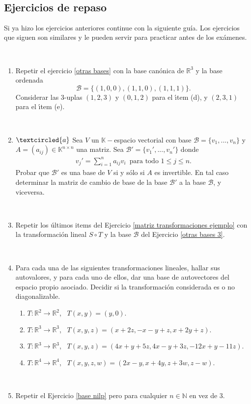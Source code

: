 \documentclass[12pt]{amsart}
\begin{document}
\


\subsection*{Ejercicios de repaso}
Si ya hizo los ejercicios anteriores continue con la siguiente gu\'ia. Los ejercicios que siguen son similares y le pueden servir para practicar antes de los ex\'amenes.

\

\begin{enumerate}[resume, topsep=5pt,itemsep=5pt]
 \item\label{otras bases 3} Repetir el ejercicio \eqref{otras bases} con la base can\'onica de $\mathbb{R}^3$ y la base ordenada $$\mathcal{B}=\{(1,0,0),(1,1,0),(1,1,1)\}.$$ Considerar las $3$-uplas $(1,2,3)$ y $(0,1,2)$ para el \'{\i}tem (d), y $(2,3,1)$
     para el \'{\i}tem (e).

 \

\item\label{cambio de base} $\textcircled{a}$ Sea $V$ un $\mathbb{K}-$espacio vectorial con base $\mathcal{B}=\{v_1, ..., v_n\}$ y $A=(a_{ij})\in\mathbb{K}^{n\times n}$ una matriz. Sea $\mathcal{B}'=\{v_1', ..., v_n'\}$ donde
\begin{align*}
v_j'=\sum_{i=1}^na_{ij}v_i\,\mbox{ para todo $1\leq j\leq n$}.
\end{align*}
Probar que $\mathcal{B}'$ es una base de $V$ si y s\'olo si $A$ es invertible. En tal caso determinar la matriz de cambio de base de la base $\mathcal{B}'$ a la base $\mathcal{B}$, y viceversa.

\

\item Repetir los \'ultimos items del Ejercicio \eqref{matriz transformaciones ejemplo} con la transformaci\'on lineal $S\circ T$ y la base
$\mathcal{B}$ del Ejercicio \eqref{otras bases 3}.

\

\item Para cada una de las siguientes transformaciones lineales, hallar sus autovalores, y para cada uno de ellos, dar una base de autovectores del espacio propio asociado.  Decidir si la transformaci\'on considerada es o no  diagonalizable.
	\begin{enumerate}
		\item $T:\mathbb{R}^2\to \mathbb{R}^2$, \ $T(x,y)=(y,0)$.
		\item $T:\mathbb{R}^3\to \mathbb{R}^3$, \ $T(x,y,z)=(x+2z,-x-y+z,x+2y+z)$.
		\item $T:\mathbb{R}^3\to \mathbb{R}^3$, \ $T(x,y,z)=(4x+y+5z,4x-y+3z,-12x+y-11z)$.
        \item $T:\mathbb{R}^4\to \mathbb{R}^4$, \ $T(x,y,z,w)=(2x-y,x+4y,z+3w,z-w)$.
	\end{enumerate}

\

\item Repetir el Ejercicio \eqref{base nilp} pero para cualquier $n\in\mathbb{N}$ en vez de 3.


\end{enumerate}
\end{document}
